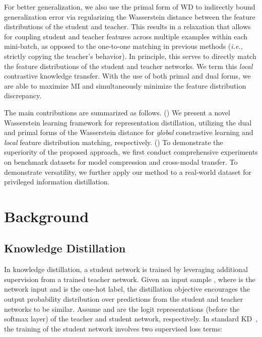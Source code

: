 \documentclass[final]{cvpr}
\theoremstyle{definition}
\begin{document}
For better generalization, we also use the primal form of WD to indirectly bound generalization error via regularizing the Wasserstein distance between the feature distributions of the student and teacher. 
This results in a relaxation that allows for coupling student and teacher features across multiple examples within each mini-batch, as opposed to the one-to-one matching in previous methods (\emph{i.e.}, strictly copying the teacher's behavior). In principle, this serves to directly match the feature distributions of the student and teacher networks. We term this \emph{local} contrastive knowledge transfer.
With the use of both primal and dual forms, we are able to maximize MI and simultaneously minimize the feature distribution discrepancy.

The main contributions are summarized as follows. () We present a novel Wasserstein learning framework for representation distillation, utilizing the dual and primal forms of the Wasserstein distance for \emph{global} constrastive learning and \emph{local} feature distribution matching, respectively. 
() To demonstrate the superiority of the proposed approach, we first conduct comprehensive experiments on benchmark datasets for model compression and cross-modal transfer. To demonstrate versatility, we further apply our method to a real-world dataset for privileged information distillation.

\section{Background}
\subsection{Knowledge Distillation}\label{sec:model}
In knowledge distillation, a student network is trained by leveraging additional supervision from a trained teacher network. Given an input sample , where  is the network input and  is the one-hot label, the distillation objective encourages the output probability distribution over predictions from the student and teacher networks to be similar. Assume  and  are the logit representations (before the softmax layer) of the teacher and student network, respectively. In standard KD~\cite{hinton2015distilling}, the training of the student network involves two supervised loss terms:
\end{document}

